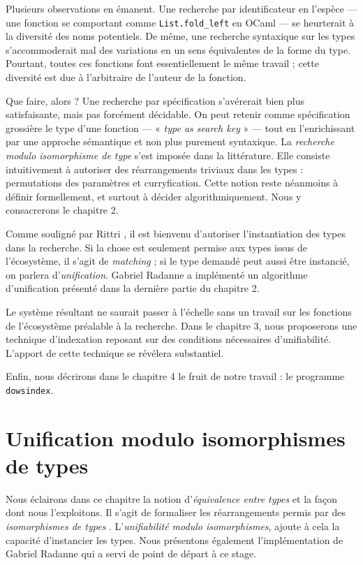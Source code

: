 \documentclass[a4paper]{report}
\theoremstyle{definition}
\newcommand{\dowsindex}{\texttt{dowsindex}\xspace}
\begin{document}
Plusieurs observations en émanent. Une recherche par identificateur en l'espèce — une fonction se comportant comme \texttt{List.fold\_left} en OCaml — se heurterait à la diversité des noms potentiels. De même, une recherche syntaxique sur les types s'accommoderait mal des variations en un sens équivalentes de la forme du type. Pourtant, toutes ces fonctions font essentiellement le même travail ; cette diversité est due à l'arbitraire de l'auteur de la fonction.

Que faire, alors ? Une recherche par spécification s'avérerait bien plus satisfaisante, mais pas forcément décidable. On peut retenir comme spécification grossière le type d'une fonction — « \textit{type as search key} » — tout en l'enrichissant par une approche sémantique et non plus purement syntaxique. La \textit{recherche modulo isomorphisme de type} s'est imposée dans la littérature. Elle consiste intuitivement à autoriser des réarrangements triviaux dans les types : permutations des paramètres et curryfication. Cette notion reste néanmoins à définir formellement, et surtout à décider algorithmiquement. Nous y consacrerons le chapitre 2.

Comme souligné par Rittri \cite{Rittri93}, il est bienvenu d'autoriser l'instantiation des types dans la recherche. Si la chose est seulement permise aux types issus de l'écosystème, il s'agit de \emph{matching} ; si le type demandé peut aussi être instancié, on parlera d'\emph{unification}. Gabriel Radanne a implémenté un algorithme d'unification présenté dans la dernière partie du chapitre 2.

Le système résultant ne saurait passer à l'échelle sans un travail sur les fonctions de l'écosystème préalable à la recherche. Dans le chapitre 3, nous proposerons une technique d'indexation reposant sur des conditions nécessaires d'unifiabilité. L'apport de cette technique se révélera substantiel.

Enfin, nous décrirons dans le chapitre 4 le fruit de notre travail : le programme \dowsindex.


\chapter{Unification modulo isomorphismes de types}

Nous éclairons dans ce chapitre la notion d'\emph{équivalence entre types} et la façon dont nous l'exploitons. Il s'agit de formaliser les réarrangements permis par des \emph{isomorphismes de types} . L'\emph{unifiabilité modulo isomorphismes}, ajoute à cela la capacité d'instancier les types. Nous présentons également l'implémentation de Gabriel Radanne qui a servi de point de départ à ce stage.
\end{document}
